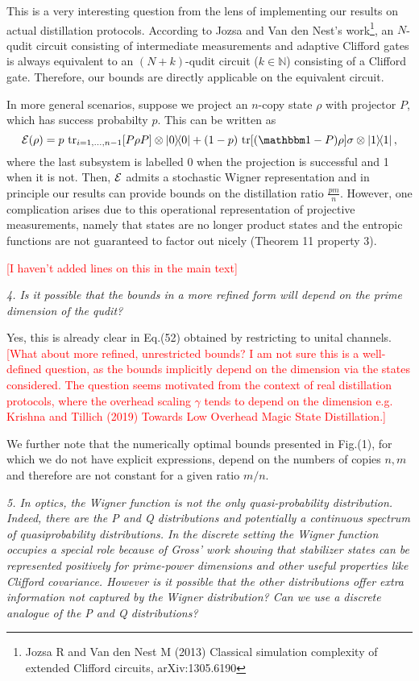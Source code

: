 \documentclass[11pt]{letter}
\newcommand{\nick}[1]{\textcolor{red}{[#1]}}
\begin{document}
This is a very interesting question from the lens of implementing our results on actual distillation protocols.
According to Jozsa and Van den Nest's work\footnote{Jozsa R and Van den Nest M (2013) Classical simulation complexity of extended Clifford circuits, arXiv:1305.6190}, an $N$-qudit circuit consisting of intermediate measurements and adaptive Clifford gates is always equivalent to an $(N+k)$-qudit circuit ($k \in \mathbb{N}$) consisting of a Clifford gate.
Therefore, our bounds are directly applicable on the equivalent circuit.

In more general scenarios, suppose we project an $n$-copy state $\rho$ with projector $P$, which has success probabilty $p$. This can be written as
\begin{equation}
	\cal{E}(\rho) = p\ \tr_{i=1,\dots,n-1} [P\rho P] \otimes \ketbra{0} + (1-p)\ \tr[(\id-P)\rho] \sigma \otimes \ketbra{1},
\end{equation}
where the last subsystem is labelled $0$ when the projection is successful and 1 when it is not.
Then, ${\mathcal E}$ admits a stochastic Wigner representation and in principle our results can provide bounds on the distillation ratio $\frac{pm}{n}$.
However, one complication arises due to this operational representation of projective measurements, namely that states are no longer product states and the entropic functions are not guaranteed to factor out nicely (Theorem 11 property 3).

\nick{I haven't added lines on this in the main text}

\textit{4. Is it possible that the bounds in a more refined form will depend on the prime dimension of the qudit?}

Yes, this is already clear in Eq.(52) obtained by restricting to unital channels.
\nick{What about more refined, unrestricted bounds? I am not sure this is a well-defined question, as the bounds implicitly depend on the dimension via the states considered. The question seems motivated from the context of real distillation protocols, where the overhead scaling $\gamma$ tends to depend on the dimension e.g. Krishna and Tillich (2019) Towards Low Overhead Magic State Distillation.}

We further note that the numerically optimal bounds presented in Fig.(1), for which we do not have explicit expressions, depend on the numbers of copies $n,m$ and therefore are not constant for a given ratio $m/n$.

\textit{5. In optics, the Wigner function is not the only quasi-probability distribution. Indeed, there are the P and Q distributions and potentially a continuous spectrum of quasiprobability distributions. In the discrete setting the Wigner function occupies a special role because of Gross' work showing that stabilizer states can be represented positively for prime-power dimensions and other useful properties like Clifford covariance. However is it possible that the other distributions offer extra information not captured by the Wigner distribution? Can we use a discrete analogue of the P and Q distributions?}
\end{document}
